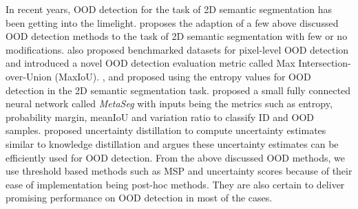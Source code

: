     In recent years, OOD detection for the task of 2D semantic segmentation has been getting into the limelight.
    \cite{pixel_OOD} proposes the adaption of a few above discussed OOD detection methods to the task of 2D semantic segmentation with few or no modifications.
    \cite{pixel_OOD} also proposed benchmarked datasets for pixel-level OOD detection and introduced a novel OOD detection evaluation metric called Max Intersection-over-Union (MaxIoU).
    \cite{SemSeg_Entropy1}, and \cite{SemSeg_Entropy2} proposed using the entropy values for OOD detection in the 2D semantic segmentation task.
    \cite{MetaSeg} proposed a small fully connected neural network called \textit{MetaSeg} with inputs being the metrics such as entropy, probability margin, meanIoU and variation ratio to classify ID and OOD samples.
    \cite{uncertianty_distillation} proposed uncertainty distillation to compute uncertainty estimates similar to knowledge distillation and argues these uncertainty estimates can be efficiently used for OOD detection.
    From the above discussed OOD methods, we use threshold based methods such as MSP and uncertainty scores because of their ease of implementation being post-hoc methods.
    They are also certain to deliver promising performance on OOD detection in most of the cases.
    


